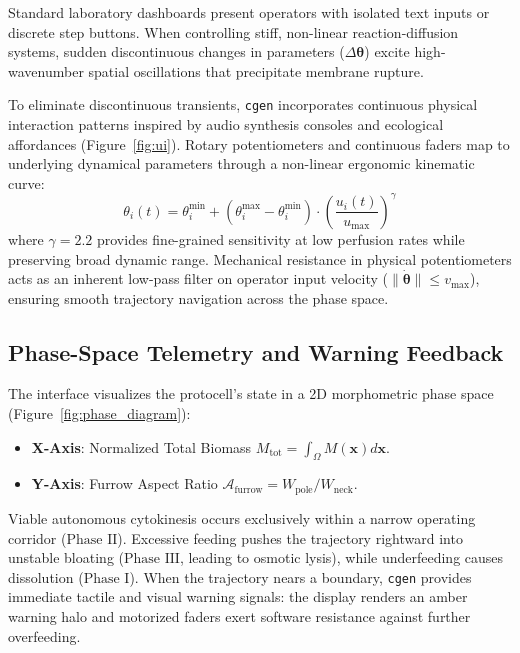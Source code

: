 \documentclass[letterpaper]{article}
\begin{document}
Standard laboratory dashboards present operators with isolated text inputs or discrete step buttons. When controlling stiff, non-linear reaction-diffusion systems, sudden discontinuous changes in parameters ($\Delta \boldsymbol{\theta}$) excite high-wavenumber spatial oscillations that precipitate membrane rupture. 

To eliminate discontinuous transients, \texttt{cgen} incorporates continuous physical interaction patterns inspired by audio synthesis consoles and ecological affordances \citep{gibson1979ecological,norman1988design} (Figure~\ref{fig:ui}). Rotary potentiometers and continuous faders map to underlying dynamical parameters through a non-linear ergonomic kinematic curve:
\begin{equation}
\theta_i(t) = \theta_i^{\min} + (\theta_i^{\max} - \theta_i^{\min}) \cdot \left(\frac{u_i(t)}{u_{\max}}\right)^\gamma
\end{equation}
where $\gamma = 2.2$ provides fine-grained sensitivity at low perfusion rates while preserving broad dynamic range. Mechanical resistance in physical potentiometers acts as an inherent low-pass filter on operator input velocity ($\|\dot{\boldsymbol{\theta}}\| \le v_{\max}$), ensuring smooth trajectory navigation across the phase space.

\subsection{Phase-Space Telemetry and Warning Feedback}

The interface visualizes the protocell's state in a 2D morphometric phase space (Figure~\ref{fig:phase_diagram}):
\begin{itemize}
    \item \textbf{X-Axis}: Normalized Total Biomass $M_{\text{tot}} = \int_\Omega M(\mathbf{x}) d\mathbf{x}$.
    \item \textbf{Y-Axis}: Furrow Aspect Ratio $\mathcal{A}_{\text{furrow}} = W_{\text{pole}} / W_{\text{neck}}$.
\end{itemize}

Viable autonomous cytokinesis occurs exclusively within a narrow operating corridor ($\text{Phase II}$). Excessive feeding pushes the trajectory rightward into unstable bloating ($\text{Phase III}$, leading to osmotic lysis), while underfeeding causes dissolution ($\text{Phase I}$). When the trajectory nears a boundary, \texttt{cgen} provides immediate tactile and visual warning signals: the display renders an amber warning halo and motorized faders exert software resistance against further overfeeding.
\end{document}
